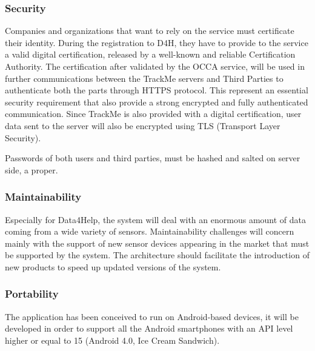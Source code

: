 \paragraph{}

{\color{Blue}\subsubsection{Security}}
Companies and organizations that want to rely on the service must certificate their identity. During the registration to D4H, they have to provide to the service a valid digital certification, released by a well-known and reliable Certification Authority. The certification after validated by the OCCA service, will be used in further communications between the TrackMe servers and Third Parties to authenticate both the parts through HTTPS protocol. This represent an essential security requirement that also provide a strong encrypted and fully authenticated communication. Since TrackMe is also provided with a digital certification, user data sent to the server will also be encrypted using TLS (Transport Layer Security). \par
Passwords of both users and third parties, must be hashed and salted on server side, a proper.
\paragraph{}

{\color{Blue}\subsubsection{Maintainability}}

Especially for Data4Help, the system will deal with an enormous amount of data coming from a wide variety of sensors. Maintainability challenges will concern mainly with the support of new sensor devices appearing in the market that must be supported by the system. The architecture should facilitate the introduction of new products to speed up updated versions of the system.
\paragraph{}

{\color{Blue}\subsubsection{Portability}}

The application has been conceived to run on Android-based devices, it will be developed in order to support all the Android smartphones with an API level higher or equal to 15 (Android 4.0, Ice Cream Sandwich).




